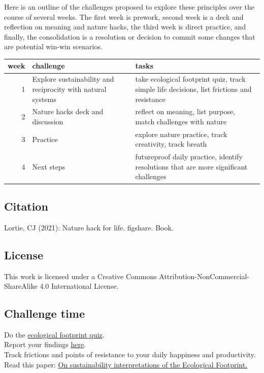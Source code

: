 \documentclass[
]{book}
\begin{document}
Here is an outline of the challenges proposed to explore these principles over the course of several weeks. The first week is prework, second week is a deck and reflection on meaning and nature hacks, the third week is direct practice, and finally, the consolidation is a resolution or decision to commit some changes that are potential win-win scenarios.

\begin{tabular}{rll}
\toprule
week & challenge & tasks\\
\midrule
1 & Explore sustainability and reciprocity with natural systems & take ecological footprint quiz, track simple life decisions, list frictions and resistance\\
2 & Nature hacks deck and discussion & reflect on meaning, list purpose, match challenges with nature\\
3 & Practice & explore nature practice, track creativity, track breath\\
4 & Next steps & futureproof daily practice, identify resolutions that are more significant challenges\\
\bottomrule
\end{tabular}

\hypertarget{citation}{%
\subsection*{Citation}\label{citation}}

Lortie, CJ (2021): Nature hack for life. figshare. Book.

\hypertarget{license}{%
\subsection*{License}\label{license}}

This work is licensed under a Creative Commons Attribution-NonCommercial-ShareAlike 4.0 International License.

\hypertarget{challenge-time}{%
\subsection*{Challenge time}\label{challenge-time}}

Do the \href{https://www.footprintcalculator.org/home/en}{ecological footprint quiz}.\\
Report your findings \href{https://forms.gle/s7wqpoFZh8ZJZPrz6}{here}.\\
Track frictions and points of resistance to your daily happiness and productivity.\\
Read this paper: \href{https://www.sciencedirect.com/science/article/pii/S092180091930518X?casa_token=K0Ms5gASF7YAAAAA:1NgRSJdbMDvAqIV_yEgJKoscztxm6ktNod5m_sCbSm7NZfyRMwZd9hvcqZwQzPNF-0rBDUTJGiw}{On sustainability interpretations of the Ecological Footprint.}
\end{document}
